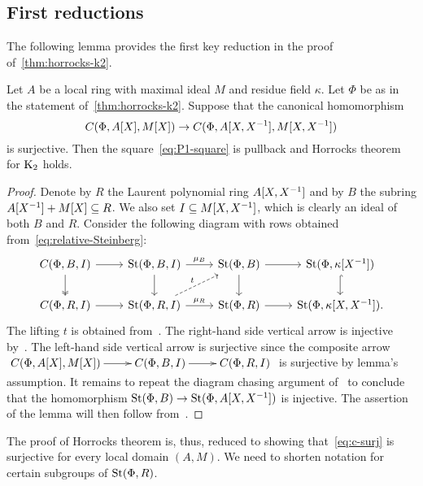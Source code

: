 \subsection{First reductions} \label{subsec:structure-theorem-overview}

The following lemma provides the first key reduction in the proof of~\cref{thm:horrocks-k2}.
\begin{lemma} \label{lem:first-reduction}
Let $A$ be a local ring with maximal ideal $M$ and residue field $\kappa$.
Let $\Phi$ be as in the statement of~\cref{thm:horrocks-k2}.
Suppose that the canonical homomorphism
\begin{equation} \label{eq:c-surj} C(\Phi, A[X], M[X]) \to C(\Phi, A[X, X^{-1}], M[X, X^{-1}]) \end{equation}
is surjective.
Then the square~\eqref{eq:P1-square} is pullback and Horrocks theorem for $\operatorname{K}_2$ holds.
\end{lemma}
\begin{proof}
    Denote by $R$ the Laurent polynomial ring $A[X, X^{-1}]$ and by $B$ the subring $A[X^{-1}] + M[X] \subseteq R$.
    We also set $I \subseteq M[X, X^{-1}]$, which is clearly an ideal of both $B$ and $R$.
    Consider the following diagram with rows obtained from~\eqref{eq:relative-Steinberg}:
    \[\begin{tikzcd}
          C(\Phi, B, I) \arrow{r} \arrow[d, swap, twoheadrightarrow] & \St(\Phi, B, I) \arrow{r}{\mu_B} \arrow{d} & \St(\Phi, B) \arrow{r} \arrow{d} & \St(\Phi, \kappa[X^{-1}]) \arrow[hookrightarrow]{d} \\
          C(\Phi, R, I) \arrow{r} & \St(\Phi, R, I) \arrow{r}{\mu_R} \arrow[ur, "t", dashrightarrow] & \St(\Phi, R) \arrow{r} & \St(\Phi, \kappa[X, X^{-1}]).
    \end{tikzcd}\]
    The lifting $t$ is obtained from~\cite[Lemma~3.3]{LS20}.
    The right-hand side vertical arrow is injective by~\cite[Lemma~2.2]{LS20}.
    The left-hand side vertical arrow is surjective since the composite arrow
    $\xymatrix{ C(\Phi, A[X], M[X]) \ar[r] & C(\Phi, B, I) \ar[r] & C(\Phi, R, I) }$
    is surjective by lemma's assumption.
    It remains to repeat the diagram chasing argument of~\cite[Theorem~1]{LS20} to conclude that the homomorphism $\operatorname{St}(\Phi, B) \to \operatorname{St}(\Phi, A[X, X^{-1}])$ is injective.
    The assertion of the lemma will then follow from~\cite[Theorem~3]{LS20}.
\end{proof}
The proof of Horrocks theorem is, thus, reduced to showing that~\eqref{eq:c-surj} is surjective for every local domain $(A, M)$.
We need to shorten notation for certain subgroups of $\operatorname{St}(\Phi, R)$.


